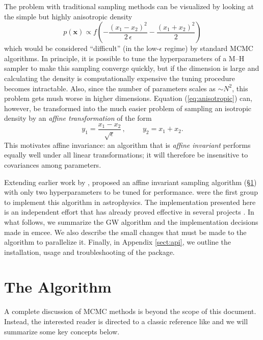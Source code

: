 \documentclass[12pt,preprint]{aastex}
\newcommand{\project}[1]{{\sffamily #1}}
\newcommand{\thisplain}{emcee}
\newcommand{\this}{\project{\thisplain}}
\newcommand{\paper}{document}
\newcommand{\Eq}[1]{Equation (\ref{eq:#1})}
\newcommand{\eqlabel}[1]{\label{eq:#1}}
\newcommand{\sect}[1]{\S\ref{sect:#1}}
\newcommand{\app}[1]{Appendix \ref{sect:#1}}
\newcommand{\sectlabel}[1]{\label{sect:#1}}
\begin{document}
The problem with traditional sampling methods can be visualized by looking
at the simple but highly anisotropic density
\begin{equation}
    \eqlabel{anisotropic}
    p(\mathbf{x}) \propto f \left (-\frac{(x_1-x_2)^2}{2\,\epsilon}
                                        - \frac{(x_1+x_2)^2}{2} \right )
\end{equation}
which would be considered ``difficult'' (in the low-$\epsilon$ regime) by
standard MCMC algorithms. In principle, it is possible to tune the
hyperparameters of a M--H sampler to make this sampling converge quickly,
but if the dimension is large and calculating the density
is computationally expensive the tuning procedure becomes intractable.
Also, since the number of parameters scales as $\sim N^2$, this problem gets
mush worse in higher dimensions.
\Eq{anisotropic} can, however, be transformed into the much easier problem of
sampling an isotropic density by an \emph{affine transformation} of the form
\begin{equation}
    y_1 = \frac{x_1-x_2}{\sqrt{\epsilon}} \, , \hspace{1cm} y_2 = x_1 + x_2.
\end{equation}
This motivates affine invariance: an algorithm that is \emph{affine invariant}
performs equally well under all linear transformations; it will therefore be
insensitive to
covariances among parameters.

Extending earlier work by \citet{Christen:2007},
\citet[][hereafter ]{Goodman:2010} proposed an
affine invariant sampling
algorithm (\sect{algo}) with only two hyperparameters to be tuned for
performance. \citet{Hou:2011} were the first group to implement this
algorithm in astrophysics. The implementation presented here is
an independent effort that has already proved effective in several projects
\citep[][Foreman-Mackey \& Widrow\ 2012, in prep.]{Lang:2011,
Bovy:2011, Dorman:2012}.
In what follows, we summarize the GW algorithm and the implementation
decisions made in \this. We also describe the small changes
that must be made to the algorithm to parallelize it. Finally, in \app{api},
we outline the installation, usage and troubleshooting of the package.

\section{The Algorithm}\sectlabel{algo}

A complete discussion of MCMC methods is beyond the scope of this \paper.
Instead, the interested reader is directed to a classic reference like
\citet{MacKay:2003} and we will summarize some key concepts below.
\end{document}
